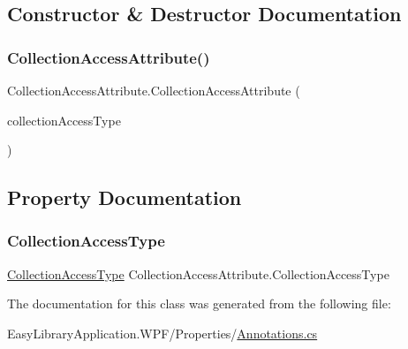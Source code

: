 \subsection{Constructor \& Destructor Documentation}
\mbox{\label{class_collection_access_attribute_a14445128bbc836c5876b84ac71307e91}} 
\subsubsection{\texorpdfstring{Collection\+Access\+Attribute()}{CollectionAccessAttribute()}}
{\footnotesize\ttfamily Collection\+Access\+Attribute.\+Collection\+Access\+Attribute (\begin{DoxyParamCaption}\item[{\mbox{\hyperlink{_annotations_8cs_ac934271c5bff522bfe4934d1e7be46a8}{Collection\+Access\+Type}}}]{collection\+Access\+Type }\end{DoxyParamCaption})}



\subsection{Property Documentation}
\mbox{\label{class_collection_access_attribute_a6f4227ee9e50c5103d73637cef1a3a9e}} 
\subsubsection{\texorpdfstring{Collection\+Access\+Type}{CollectionAccessType}}
{\footnotesize\ttfamily \mbox{\hyperlink{_annotations_8cs_ac934271c5bff522bfe4934d1e7be46a8}{Collection\+Access\+Type}} Collection\+Access\+Attribute.\+Collection\+Access\+Type\hspace{0.3cm}{\ttfamily [get]}}



The documentation for this class was generated from the following file\+:\begin{DoxyCompactItemize}
\item 
Easy\+Library\+Application.\+W\+P\+F/\+Properties/\mbox{\hyperlink{_annotations_8cs}{Annotations.\+cs}}\end{DoxyCompactItemize}
